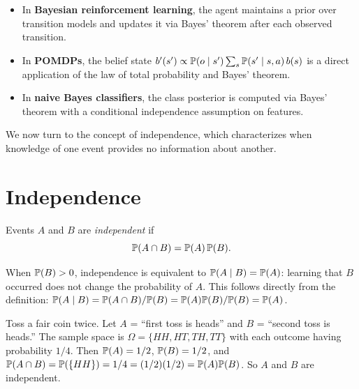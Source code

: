 \documentclass[11pt,a4paper]{article}
\begin{document}
\begin{rlconnection}[title={Bayes' Theorem in RL/ML}]
\begin{itemize}[nosep]
    \item In \textbf{Bayesian reinforcement learning}, the agent maintains a
    prior over transition models and updates it via Bayes' theorem after
    each observed transition.
    \item In \textbf{POMDPs}, the belief state
    $b'(s') \propto \mathbb{P}(o \mid s') \sum_s \mathbb{P}(s' \mid s, a) \, b(s)$
    is a direct application of the law of total probability and Bayes'
    theorem.
    \item In \textbf{naive Bayes classifiers}, the class posterior is
    computed via Bayes' theorem with a conditional independence assumption
    on features.
\end{itemize}
\end{rlconnection}

We now turn to the concept of independence, which characterizes when
knowledge of one event provides no information about another.


\section{Independence}
\label{sec:independence}

\begin{definition}
\label{def:indep_two}
Events $A$ and $B$ are \emph{independent} if
\[
    \mathbb{P}(A \cap B) = \mathbb{P}(A) \, \mathbb{P}(B).
\]
\end{definition}

\begin{remark}
\label{rem:indep_conditional}
When $\mathbb{P}(B) > 0$, independence is equivalent to
$\mathbb{P}(A \mid B) = \mathbb{P}(A)$: learning that $B$ occurred does not change
the probability of $A$. This follows directly from the definition:
$\mathbb{P}(A \mid B) = \mathbb{P}(A \cap B)/\mathbb{P}(B) = \mathbb{P}(A)\mathbb{P}(B)/\mathbb{P}(B)
= \mathbb{P}(A)$.
\end{remark}

\begin{example}
\label{ex:indep_coins}
Toss a fair coin twice. Let $A$ = ``first toss is heads'' and
$B$ = ``second toss is heads.'' The sample space is
$\Omega = \{HH, HT, TH, TT\}$ with each outcome having probability
$1/4$. Then $\mathbb{P}(A) = 1/2$, $\mathbb{P}(B) = 1/2$, and
$\mathbb{P}(A \cap B) = \mathbb{P}(\{HH\}) = 1/4 = (1/2)(1/2)
= \mathbb{P}(A)\mathbb{P}(B)$. So $A$ and $B$ are independent.
\end{example}
\end{document}

